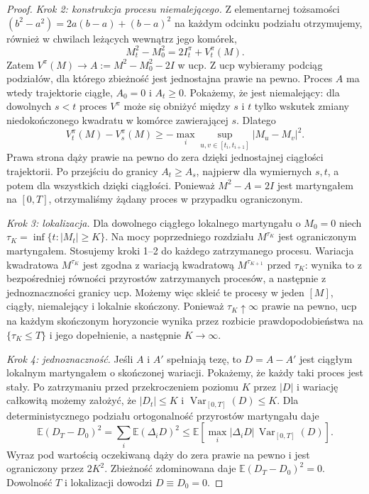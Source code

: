 \documentclass[11pt,a4paper,oneside]{report}
\numberwithin{equation}{chapter}
\theoremstyle{plain}
\theoremstyle{definition}
\theoremstyle{remark}
\newcommand{\E}{\mathbb{E}}
\begin{document}
\begin{proof}
\emph{Krok 2: konstrukcja procesu niemalejącego.}
Z elementarnej tożsamości
$(b^2-a^2)=2a(b-a)+(b-a)^2$
na każdym odcinku podziału otrzymujemy, również
w chwilach leżących wewnątrz jego komórek,
\[
M_t^2-M_0^2=2I_t^\pi+V_t^\pi(M).
\]
Zatem $V^\pi(M)\to A:=M^2-M_0^2-2I$ w ucp.
Z ucp wybieramy podciąg podziałów, dla którego
zbieżność jest jednostajna prawie na pewno.
Proces $A$ ma wtedy trajektorie ciągłe, $A_0=0$
i $A_t\ge0$. Pokażemy, że jest niemalejący:
dla dowolnych $s<t$ proces $V^\pi$ może się obniżyć
między $s$ i $t$ tylko wskutek zmiany niedokończonego
kwadratu w komórce zawierającej $s$. Dlatego
\[
V_t^\pi(M)-V_s^\pi(M)
\ge-\max_i\sup_{u,v\in[t_i,t_{i+1}]}
|M_u-M_v|^2.
\]
Prawa strona dąży prawie na pewno do zera dzięki
jednostajnej ciągłości trajektorii. Po przejściu
do granicy $A_t\ge A_s$, najpierw dla wymiernych
$s,t$, a potem dla wszystkich dzięki ciągłości.
Ponieważ $M^2-A=2I$ jest martyngałem na $[0,T]$,
otrzymaliśmy żądany proces w przypadku ograniczonym.

\emph{Krok 3: lokalizacja.}
Dla dowolnego ciągłego lokalnego martyngału o $M_0=0$
niech $\tau_K=\inf\{t:|M_t|\ge K\}$.
Na mocy poprzedniego rozdziału $M^{\tau_K}$ jest
ograniczonym martyngałem. Stosujemy kroki 1--2 do
każdego zatrzymanego procesu. Wariacja kwadratowa
$M^{\tau_K}$ jest zgodna z wariacją kwadratową
$M^{\tau_{K+1}}$ przed $\tau_K$: wynika to z
bezpośredniej równości przyrostów zatrzymanych
procesów, a następnie z jednoznaczności granicy
ucp. Możemy więc skleić te procesy w jeden
$[M]$, ciągły, niemalejący i lokalnie skończony.
Ponieważ $\tau_K\uparrow\infty$ prawie na pewno,
ucp na każdym skończonym horyzoncie wynika przez
rozbicie prawdopodobieństwa na $\{\tau_K\le T\}$
i jego dopełnienie, a następnie $K\to\infty$.

\emph{Krok 4: jednoznaczność.}
Jeśli $A$ i $A'$ spełniają tezę, to $D=A-A'$ jest
ciągłym lokalnym martyngałem o skończonej wariacji.
Pokażemy, że każdy taki proces jest stały.
Po zatrzymaniu przed przekroczeniem poziomu $K$ przez
$|D|$ i wariację całkowitą możemy założyć, że
$|D_t|\le K$ i $\operatorname{Var}_{[0,T]}(D)\le K$.
Dla deterministycznego podziału ortogonalność przyrostów
martyngału daje
\[
\E(D_T-D_0)^2=\sum_i\E(\Delta_iD)^2
\le\E\left[\max_i|\Delta_iD|\,
\operatorname{Var}_{[0,T]}(D)\right].
\]
Wyraz pod wartością oczekiwaną dąży do zera prawie
na pewno i jest ograniczony przez $2K^2$.
Zbieżność zdominowana daje $\E(D_T-D_0)^2=0$.
Dowolność $T$ i lokalizacji dowodzi $D\equiv D_0=0$.
\end{proof}
\end{document}
